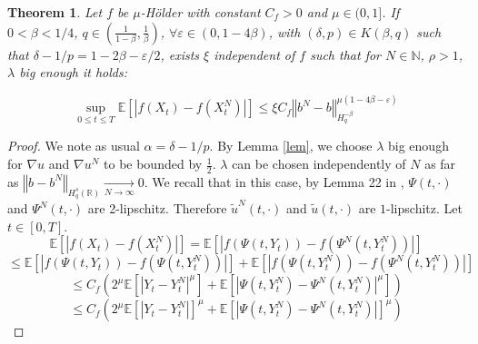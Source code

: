 \documentclass[11pt]{enstaPRE}
\newtheorem{theo}{Theorem}
\newcommand{\norme}[1]{\left\Vert #1\right\Vert}
\newcommand{\R}{\mathbb{R}}
\newcommand{\N}{\mathbb{N}}
\newcommand{\E}{\mathbb{E}}
\begin{document}
\begin{theo}
    Let $f$ be $\mu$-Hölder with constant $C_f>0$ and $\mu\in(0,1]$. If $0<\beta < 1/4$, $q\in\left(\frac{1}{1-\beta},\frac{1}{\beta}\right)$, $\forall \varepsilon \in(0,1-4\beta)$, with  $(\delta,p)\in K(\beta,q)$ such that $\delta - 1/p = 1-2\beta - \varepsilon/2$, exists $\xi$ independent of $f$ such that for $N\in\N$, $\rho>1$, $\lambda$ big enough it holds:
    
    \begin{equation*}
    \underset{0\leq t\leq T} {\sup}\E\left[\left|f\left(X_t\right)-f\left(X_t^N\right)\right|\right] \leq \xi C_f \norme{b^N-b}_{H^{-\beta}_{q}}^{\mu\left(1-4\beta-\varepsilon\right)}
    \end{equation*}
\end{theo}

\begin{proof}
    We note as usual $\alpha = \delta - 1/p$.
    By Lemma \ref{lem}, we choose $\lambda$ big enough for $\nabla u$ and $\nabla u^N$ to be bounded by $\frac{1}{2}$. $\lambda$ can be chosen independently of $N$ as far as $\norme{b - b^N}_{H_q^s(\R)} \underset{N\rightarrow\infty}{\longrightarrow} 0$. We recall that in this case, by Lemma 22 in \cite{Fla-Iss-Rus-2017}, $\Psi(t,\cdot)$ and $\Psi^N(t,\cdot)$ are 2-lipschitz. Therefore $\widetilde{u}^N(t,\cdot)$ and $\widetilde{u}(t,\cdot)$ are $1$-lipschitz.  Let $t\in[0,T]$.      
    \begin{equation*}
    \E\left[\left|f\left(X_t\right)-f\left(X_t^N\right)\right|\right] = \E\left[\left|f\left(\Psi\left(t,Y_t\right)\right)-f\left(\Psi^N\left(t,Y_t^N\right)\right)\right|\right]
    \end{equation*}   
    \begin{equation*}
    \leq  \E\left[\left|f\left(\Psi\left(t,Y_t\right)\right)-f\left(\Psi\left(t,Y_t^N\right)\right)\right|\right]+\E\left[\left|f\left(\Psi\left(t,Y_t^N\right)\right)-f\left(\Psi^N\left(t,Y_t^N\right)\right)\right|\right]
    \end{equation*}  
    \begin{equation*}
    \leq C_f  \left(2^\mu\E\left[\left|Y_t-Y_t^N\right|^\mu\right]+\E\left[\left|\Psi\left(t,Y_t^N\right)-\Psi^N\left(t,Y_t^N\right)\right|^\mu\right]\right)
    \end{equation*}
    \begin{equation}\label{jensen}
    \leq C_f  \left(2^\mu\E\left[\left|Y_t-Y_t^N\right|\right]^\mu+\E\left[\left|\Psi\left(t,Y_t^N\right)-\Psi^N\left(t,Y_t^N\right)\right|\right]^\mu\right)

\end{equation}
\end{proof}
\end{document}
